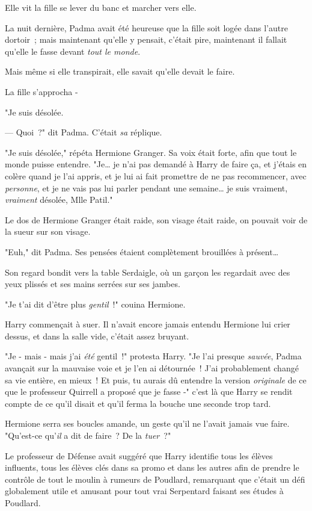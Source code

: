 Elle vit la fille se lever du banc et marcher vers elle.

La nuit dernière, Padma avait été heureuse que la fille soit logée dans l'autre dortoir~; mais maintenant qu'elle y pensait, c'était pire, maintenant il fallait qu'elle le fasse devant \emph{tout le monde}.

Mais même si elle transpirait, elle savait qu'elle devait le faire.

La fille s'approcha -

"Je suis désolée.

--- Quoi~?" dit Padma. C'était \emph{sa} réplique.

"Je suis désolée," répéta Hermione Granger. Sa voix était forte, afin que tout le monde puisse entendre. "Je… je n'ai pas demandé à Harry de faire ça, et j'étais en colère quand je l'ai appris, et je lui ai fait promettre de ne pas recommencer, avec \emph{personne}, et je ne vais pas lui parler pendant une semaine… je suis vraiment, \emph{vraiment} désolée, Mlle Patil."

Le dos de Hermione Granger était raide, son visage était raide, on pouvait voir de la sueur sur son visage.

"Euh," dit Padma. Ses pensées étaient complètement brouillées à présent…

Son regard bondit vers la table Serdaigle, où un garçon les regardait avec des yeux plissés et ses mains serrées sur ses jambes.


"Je t'ai dit d'être plus \emph{gentil}~!" couina Hermione.

Harry commençait à suer. Il n'avait encore jamais entendu Hermione lui crier dessus, et dans la salle vide, c'était assez bruyant.

"Je - mais - mais j'ai \emph{été} gentil~!" protesta Harry. "Je l'ai presque \emph{sauvée}, Padma avançait sur la mauvaise voie et je l'en ai détournée~! J'ai probablement changé sa vie entière, en mieux~! Et puis, tu aurais dû entendre la version \emph{originale} de ce que le professeur Quirrell a proposé que je fasse -" c'est là que Harry se rendit compte de ce qu'il disait et qu'il ferma la bouche une seconde trop tard.

Hermione serra ses boucles amande, un geste qu'il ne l'avait jamais vue faire. "Qu'est-ce qu'\emph{il} a dit de faire~? De la \emph{tuer}~?"

Le professeur de Défense avait suggéré que Harry identifie tous les élèves influents, tous les élèves clés dans sa promo et dans les autres afin de prendre le contrôle de tout le moulin à rumeurs de Poudlard, remarquant que c'était un défi globalement utile et amusant pour tout vrai Serpentard faisant ses études à Poudlard.

